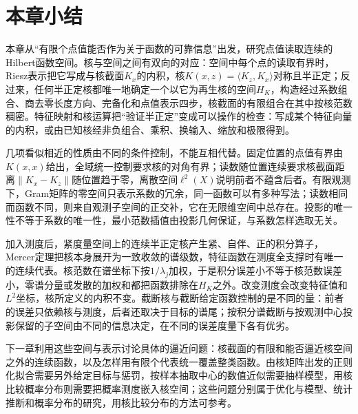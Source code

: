 
\section{本章小结}
\label{sec:rkhs-summary}

本章从“有限个点值能否作为关于函数的可靠信息”出发，研究点值读取连续的Hilbert函数空间。核与空间之间有双向的对应：空间中每个点的读取有界时，Riesz表示把它写成与核截面$K_x$的内积，核$K(x,z)=\langle K_z,K_x\rangle$对称且半正定；反过来，任何半正定核都唯一地确定一个以它为再生核的空间$H_K$，构造经过系数组合、商去零长度方向、完备化和点值表示四步，核截面的有限组合在其中按核范数稠密。特征映射和核运算把“验证半正定”变成可以操作的检查：写成某个特征向量的内积，或由已知核经非负组合、乘积、换输入、缩放和极限得到。

几项看似相近的性质由不同的条件控制，不能互相代替。固定位置的点值有界由$K(x,x)$给出，全域统一控制要求核的对角有界；读数随位置连续要求核截面距离$\|K_x-K_z\|$随位置趋于零，离散空间$\ell^2(X)$说明前者不蕴含后者。有限观测下，Gram矩阵的零空间只表示系数的冗余，同一函数可以有多种写法；读数相同而函数不同，则来自观测子空间的正交补，它在无限维空间中总存在。投影的唯一性不等于系数的唯一性，最小范数插值由投影几何保证，与系数怎样选取无关。

加入测度后，紧度量空间上的连续半正定核产生紧、自伴、正的积分算子，Mercer定理把核本身展开为一致收敛的谱级数，特征函数在测度全支撑时有唯一的连续代表。核范数在谱坐标下按$1/\lambda_j$加权，于是积分误差小不等于核范数误差小，零谱分量或发散的加权和都把函数排除在$H_K$之外。改变测度会改变特征值和$L^2$坐标，核所定义的内积不变。截断核与截断给定函数控制的是不同的量：前者的误差只依赖核与测度，后者还取决于目标的谱尾；按积分谱截断与按观测中心投影保留的子空间由不同的信息决定，在不同的误差度量下各有优劣。

下一章利用这些空间与表示讨论具体的逼近问题：核截面的有限和能否逼近核空间之外的连续函数，以及怎样用有限个代表统一覆盖整类函数。由核矩阵出发的正则化拟合需要另外给定目标与惩罚，按样本抽取中心的数值近似需要抽样模型，用核比较概率分布则需要把概率测度嵌入核空间；这些问题分别属于优化与模型、统计推断和概率分布的研究，用核比较分布的方法可参考。
